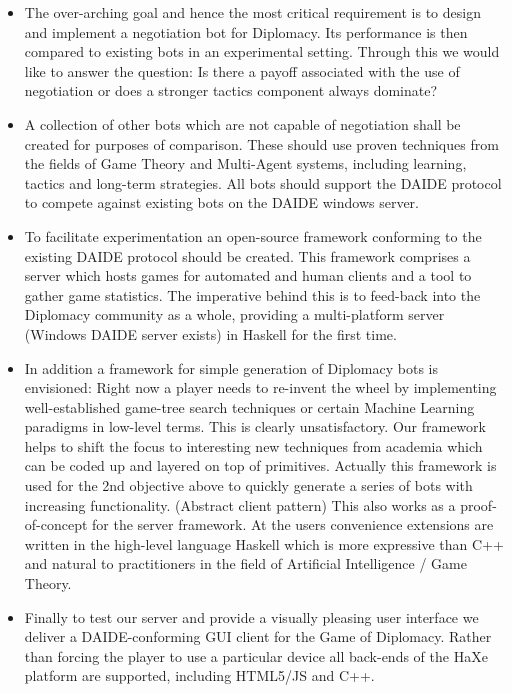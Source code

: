 \documentclass[pdftex,11pt,a4paper]{report}
\begin{document}
\begin{itemize}

\item The over-arching goal and hence the most critical requirement is
  to design and implement a negotiation bot for Diplomacy. Its
  performance is then compared to existing bots in an experimental
  setting. Through this we would like to answer the question: Is there
  a payoff associated with the use of negotiation or does a stronger
  tactics component always dominate? 

\item A collection of other bots which are not capable of negotiation
  shall be created for purposes of comparison. These should use
  proven techniques from the fields of Game Theory and Multi-Agent
  systems, including learning, tactics and long-term strategies. All
  bots should support the DAIDE protocol to compete against existing
  bots on the DAIDE windows server.

\item To facilitate experimentation an open-source framework
  conforming to the existing DAIDE protocol should be created. This
  framework comprises a server which hosts games for automated and
  human clients and a tool to gather game statistics. The imperative
  behind this is to feed-back into the Diplomacy community as a whole,
  providing a multi-platform server (Windows DAIDE server exists) in 
  Haskell for the first time.

\item In addition a framework for simple generation of Diplomacy bots
  is envisioned: Right now a player needs to re-invent the wheel by
  implementing well-established game-tree search techniques or certain
  Machine Learning paradigms in low-level terms. This is clearly
  unsatisfactory. Our framework helps to shift the focus to
  interesting new techniques from academia which can be coded up and
  layered on top of primitives. Actually this framework is used for
  the 2nd objective above to quickly generate a series of bots with
  increasing functionality.  (Abstract client pattern) This also works
  as a proof-of-concept for the server framework. At the users
  convenience extensions are written in the high-level language
  Haskell which is more expressive than C++ and natural to
  practitioners in the field of Artificial Intelligence / Game Theory.

\item Finally to test our server and provide a visually pleasing user
  interface we deliver a DAIDE-conforming GUI client for the Game
  of Diplomacy.  Rather than forcing the player to use a particular
  device all back-ends of the HaXe platform are supported, including
  HTML5/JS and C++.

\end{itemize}
\end{document}
